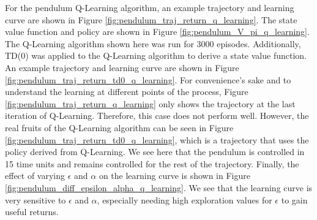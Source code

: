 For the pendulum Q-Learning algorithm, an example trajectory and learning curve are shown in Figure \ref{fig:pendulum_traj_return_q_learning}. The state value function and policy are shown in Figure \ref{fig:pendulum_V_pi_q_learning}. The Q-Learning algorithm shown here was run for 3000 episodes. Additionally, TD(0) was applied to the Q-Learning algorithm to derive a state value function. An example trajectory and learning curve are shown in Figure \ref{fig:pendulum_traj_return_td0_q_learning}. For convenience's sake and to understand the learning at different points of the process, Figure \ref{fig:pendulum_traj_return_q_learning} only shows the trajectory at the last iteration of Q-Learning. Therefore, this case does not perform well. However, the real fruits of the Q-Learning algorithm can be seen in Figure \ref{fig:pendulum_traj_return_td0_q_learning}, which is a trajectory that uses the policy derived from Q-Learning. We see here that the pendulum is controlled in 15 time units and remains controlled for the rest of the trajectory. Finally, the effect of varying $\epsilon$ and $\alpha$ on the learning curve is shown in Figure \ref{fig:pendulum_diff_epsilon_alpha_q_learning}. We see that the learning curve is very sensitive to $\epsilon$ and $\alpha$, especially needing high exploration values for $\epsilon$ to gain useful returns.
